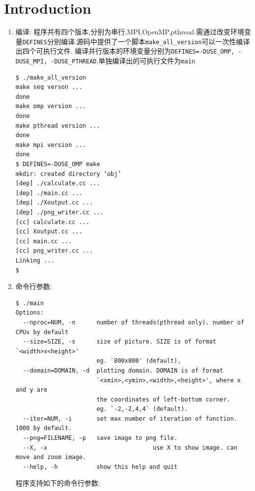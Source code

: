 \section{Introduction}

\begin{enumerate}
	\item 编译:  
		程序共有四个版本,分别为串行,MPI,OpenMP,pthread.需通过改变环境变量\verb|DEFINES|分别编译.源码中提供了一个脚本\verb|make_all_version|可以一次性编译出四个可执行文件.
		编译并行版本的环境变量分别为\verb|DEFINES=-DUSE_OMP, -DUSE_MPI, -DUSE_PTHREAD|,单独编译出的可执行文件为\verb|main|
\begin{lstlisting}
$ ./make_all_version
make seq verson ...
done
make omp version ...
done
make pthread version ...
done
make mpi version ...
done
$ DEFINES=-DUSE_OMP make
mkdir: created directory ‘obj’
[dep] ./calculate.cc ...
[dep] ./main.cc ...
[dep] ./Xoutput.cc ...
[dep] ./png_writer.cc ...
[cc] calculate.cc ...
[cc] Xoutput.cc ...
[cc] main.cc ...
[cc] png_writer.cc ...
Linking ...
$
\end{lstlisting}

\item 命令行参数:
	\begin{lstlisting}[basicstyle=\scriptsize\ttfamily]
$ ./main
Options:
  --nproc=NUM, -n      number of threads(pthread only). number of CPUs by default
  --size=SIZE, -s      size of picture. SIZE is of format `<width>x<height>'
                       eg. `800x800' (default), 
  --domain=DOMAIN, -d  plotting domain. DOMAIN is of format 
                       `<xmin>,<ymin>,<width>,<height>', where x and y are 
                       the coordinates of left-bottom corner.
                       eg. `-2,-2,4,4` (default).
  --iter=NUM, -i       set max number of iteration of function. 1000 by default.
  --png=FILENAME, -p   save image to png file.
  --X, -x                              use X to show image. can move and zoom image.
  --help, -h           show this help and quit
\end{lstlisting}
程序支持如下的命令行参数:



\end{enumerate}
